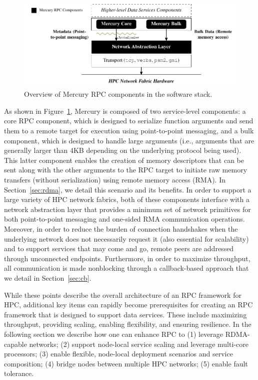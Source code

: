 \documentclass[11pt]{article}
\begin{document}
\begin{figure}[h]
\centering
\includegraphics{figs/overview}
\caption{Overview of Mercury RPC components in the software stack.}
\label{fig:overview}
\end{figure}

As shown in Figure~\ref{fig:overview}, Mercury is composed of
two service-level components:
a core RPC component, which is designed to serialize
function arguments and send them to a remote target for execution using
point-to-point messaging, and a bulk
component, which is designed to handle large arguments (i.e., arguments that are
generally larger than 4KB depending on the underlying protocol being used).
This latter component enables the creation of
memory descriptors that can be sent along with the other arguments to the RPC
target to initiate raw memory transfers (without serialization) using remote memory access (RMA).
In Section~\ref{sec:rdma}, we detail this scenario and its benefits.
%
In order to support a large variety of HPC network fabrics,
both of these components interface with a network abstraction
layer that provides a minimum set of network primitives for both
point-to-point messaging and one-sided RMA communication operations.
Moreover, in order to reduce the burden of connection handshakes
when the underlying network does not necessarily request it (also
essential for scalability) and to support services that may come and go,
remote peers are addressed through unconnected endpoints.
Furthermore, in order to maximize throughput, all communication is made
nonblocking through a callback-based approach that we detail in
Section~\ref{sec:cb}.

While these points describe the overall architecture of an RPC
framework for HPC, additional key items can rapidly become prerequisites for
creating an RPC framework that is designed to support data services. These
include maximizing throughput, providing scaling, 
enabling flexibility, and ensuring resilience. In the
following section we describe how one can enhance RPC to (1) leverage RDMA-capable networks;
(2) support node-local service scaling and leverage multi-core processors;
(3) enable flexible, node-local deployment scenarios and service 
composition; (4) bridge nodes between multiple HPC networks; (5) enable fault tolerance.
\end{document}
